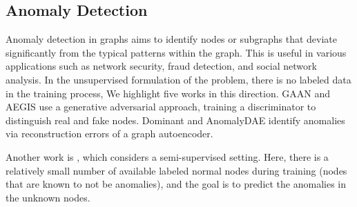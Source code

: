 \documentclass[letterpaper]{article} %
\begin{document}








\subsection{Anomaly Detection}
\label{extended_sec:anomaly_detection}
Anomaly detection in graphs aims to identify nodes or subgraphs that deviate significantly from the typical patterns within the graph. This is useful in various applications such as network security, fraud detection, and social network analysis. In the unsupervised formulation of the problem, there is no labeled data in the training process, We highlight five works in this direction. GAAN \cite{chen2020gaan} and AEGIS \cite{ding2021aegis} use a generative adversarial approach, training a discriminator to distinguish real and fake nodes. Dominant \cite{ding2019dominant} and AnomalyDAE \cite{fan2020anomalydae} identify anomalies via reconstruction errors of a graph autoencoder. 

Another work is \cite{qiao2024ggad}, which considers a semi-supervised setting. Here, there is a relatively small number of available labeled normal nodes during training (nodes that are known to not be anomalies), and the goal is to predict the anomalies in the unknown nodes.
\end{document}
